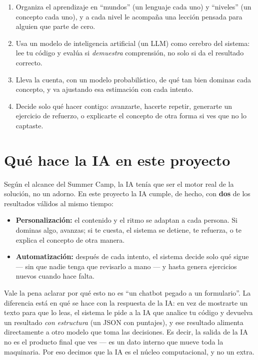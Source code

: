 \documentclass[11pt,letterpaper]{article}
\begin{document}
\begin{enumerate}[leftmargin=*]
  \item Organiza el aprendizaje en ``mundos'' (un lenguaje cada uno) y
  ``niveles'' (un concepto cada uno), y a cada nivel le acompaña una
  lección pensada para alguien que parte de cero.
  \item Usa un modelo de inteligencia artificial (un LLM) como cerebro
  del sistema: lee tu código y evalúa si \textit{demuestra}
  comprensión, no solo si da el resultado correcto.
  \item Lleva la cuenta, con un modelo probabilístico, de qué tan bien
  dominas cada concepto, y va ajustando esa estimación con cada
  intento.
  \item Decide solo qué hacer contigo: avanzarte, hacerte repetir,
  generarte un ejercicio de refuerzo, o explicarte el concepto de otra
  forma si ves que no lo captaste.
\end{enumerate}

\section{Qué hace la IA en este proyecto}

Según el alcance del Summer Camp, la IA tenía que ser el motor real de
la solución, no un adorno. En este proyecto la IA cumple, de hecho, con
\textbf{dos} de los resultados válidos al mismo tiempo:

\begin{itemize}[leftmargin=*]
  \item \textbf{Personalización:} el contenido y el ritmo se adaptan a
  cada persona. Si dominas algo, avanzas; si te cuesta, el sistema se
  detiene, te refuerza, o te explica el concepto de otra manera.
  \item \textbf{Automatización:} después de cada intento, el sistema
  decide solo qué sigue --- sin que nadie tenga que revisarlo a mano ---
  y hasta genera ejercicios nuevos cuando hace falta.
\end{itemize}

Vale la pena aclarar por qué esto no es ``un chatbot pegado a un
formulario''. La diferencia está en qué se hace con la respuesta de la
IA: en vez de mostrarte un texto para que lo leas, el sistema le pide a
la IA que analice tu código y devuelva un resultado \textit{con
estructura} (un JSON con puntajes), y ese resultado alimenta
directamente a otro modelo que toma las decisiones. Es decir, la salida
de la IA no es el producto final que ves --- es un dato interno que
mueve toda la maquinaria. Por eso decimos que la IA es el núcleo
computacional, y no un extra.
\end{document}
